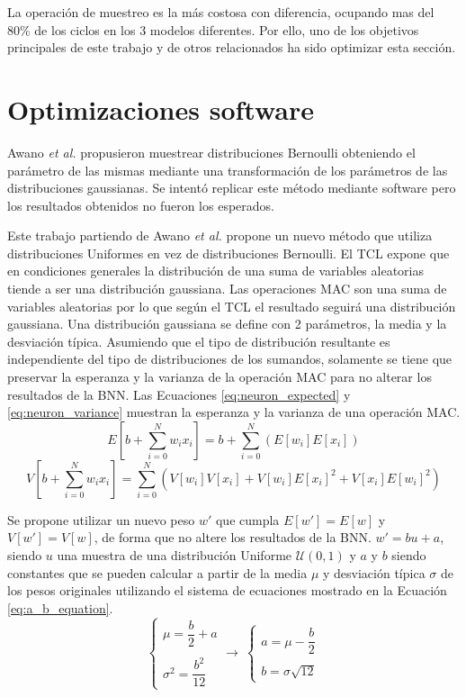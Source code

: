 La operación de muestreo es la más costosa con diferencia, ocupando mas del 80\% de los ciclos en los 3 modelos diferentes. Por ello, uno de los objetivos principales de este trabajo y de otros relacionados ha sido optimizar esta sección.

\section{Optimizaciones software}

Awano \emph{et al.} \cite{bnn_clt_approx} propusieron muestrear distribuciones Bernoulli obteniendo el parámetro de las mismas mediante una transformación de los parámetros de las distribuciones gaussianas. Se intentó replicar este método mediante software pero los resultados obtenidos no fueron los esperados.

\todo

Este trabajo partiendo de Awano \emph{et al.} propone un nuevo método que utiliza distribuciones Uniformes en vez de distribuciones Bernoulli. El TCL expone que en condiciones generales la distribución de una suma de variables aleatorias tiende a ser una distribución gaussiana. Las operaciones MAC son una suma de variables aleatorias por lo que según el TCL el resultado seguirá una distribución gaussiana. Una distribución gaussiana se define con 2 parámetros, la media y la desviación típica. Asumiendo que el tipo de distribución resultante es independiente del tipo de distribuciones de los sumandos, solamente se tiene que preservar la esperanza y la varianza de la operación MAC para no alterar los resultados de la BNN. Las Ecuaciones \ref{eq:neuron_expected}  y \ref{eq:neuron_variance} muestran la esperanza y la varianza de una operación MAC.
\begin{equation} \label{eq:neuron_expected}
E\left[ b + \sum_{i=0}^N w_i x_i \right]  = b + \sum_{i=0}^N ( E[w_i] E[x_i] )
\end{equation}
\begin{equation} \label{eq:neuron_variance}
V\left[ b + \sum_{i=0}^N w_i x_i \right] = \sum_{i=0}^N ( V[w_i]V[x_i] + V[w_i]E[x_i]^2 + V[x_i]E[w_i]^2 )
\end{equation}

Se propone utilizar un nuevo peso $w'$ que cumpla $E[w'] = E[w]$ y $V[w'] = V[w]$, de forma que no altere los resultados de la BNN. $w' = bu + a$, siendo $u$ una muestra de una distribución Uniforme $\mathcal{U}(0,1)$ y $a$ y $b$ siendo constantes que se pueden calcular a partir de la media $\mu$ y desviación típica $\sigma$ de los pesos originales utilizando el sistema de ecuaciones mostrado en la Ecuación \ref{eq:a_b_equation}.
\begin{equation}\label{eq:a_b_equation}
\begin{cases}
\mu = \dfrac{b}{2} + a\\ \\
\sigma^2 = \dfrac{b^2}{12}
\end{cases}
\rightarrow\ 
\begin{cases}
a = \mu - \dfrac{b}{2}\\ \\
b = \sigma \sqrt{12}
\end{cases}
\end{equation}


